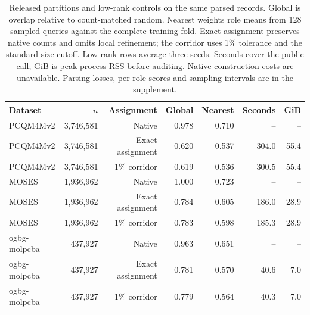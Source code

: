 \begin{table}[htbp]\centering\small
\begin{tabular}{lrrrrrr}
\toprule
Dataset & $n$ & Assignment & Global & Nearest & Seconds & GiB\\\midrule
PCQM4Mv2 & 3,746,581 & Native & 0.978 & 0.710 & -- & --\\
PCQM4Mv2 & 3,746,581 & Exact assignment & 0.620 & 0.537 & 304.0 & 55.4\\
PCQM4Mv2 & 3,746,581 & 1\% corridor & 0.619 & 0.536 & 300.5 & 55.4\\
MOSES & 1,936,962 & Native & 1.000 & 0.723 & -- & --\\
MOSES & 1,936,962 & Exact assignment & 0.784 & 0.605 & 186.0 & 28.9\\
MOSES & 1,936,962 & 1\% corridor & 0.783 & 0.598 & 185.3 & 28.9\\
ogbg-molpcba & 437,927 & Native & 0.963 & 0.651 & -- & --\\
ogbg-molpcba & 437,927 & Exact assignment & 0.781 & 0.570 & 40.6 & 7.0\\
ogbg-molpcba & 437,927 & 1\% corridor & 0.779 & 0.564 & 40.3 & 7.0\\
\bottomrule\end{tabular}
\caption{Released partitions and low-rank controls on the same parsed records. Global is overlap relative to count-matched random. Nearest weights role means from 128 sampled queries against the complete training fold. Exact assignment preserves native counts and omits local refinement; the corridor uses 1\% tolerance and the standard size cutoff. Low-rank rows average three seeds. Seconds cover the public call; GiB is peak process RSS before auditing. Native construction costs are unavailable. Parsing losses, per-role scores and sampling intervals are in the supplement.}
\label{tab:native-molecular}
\end{table}
